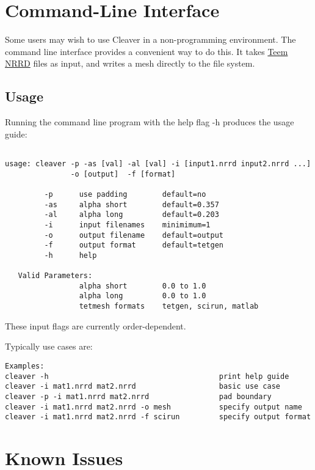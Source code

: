 \documentclass[fleqn,12pt,openany]{book}
\begin{document}
\chapter{Command-Line Interface}
\label{sec:commandline}

Some users may wish to use Cleaver in a non-programming environment.
The command line interface provides a convenient way to do this. It
takes \href{http://teem.sourceforge.net/nrrd/index.html}{Teem NRRD} 
files as input, and writes a mesh directly to the file system.

\section{Usage}

Running the command line program with the help flag -h produces the
usage guide:\\

\begin{Verbatim}[frame=single]

usage: cleaver -p -as [val] -al [val] -i [input1.nrrd input2.nrrd ...]
               -o [output]  -f [format]

         -p      use padding        default=no
         -as     alpha short        default=0.357
         -al     alpha long         default=0.203
         -i      input filenames    minimimum=1
         -o      output filename    default=output
         -f      output format      default=tetgen
         -h      help

   Valid Parameters:
                 alpha short        0.0 to 1.0
                 alpha long         0.0 to 1.0
                 tetmesh formats    tetgen, scirun, matlab
\end{Verbatim}

These input flags are currently order-dependent. 
\newpage

Typically use cases are:


\begin{Verbatim}[frame=single]
Examples:
cleaver -h                                       print help guide
cleaver -i mat1.nrrd mat2.nrrd                   basic use case
cleaver -p -i mat1.nrrd mat2.nrrd                pad boundary
cleaver -i mat1.nrrd mat2.nrrd -o mesh           specify output name
cleaver -i mat1.nrrd mat2.nrrd -f scirun         specify output format
\end{Verbatim}

\chapter{Known Issues}
\end{document}
